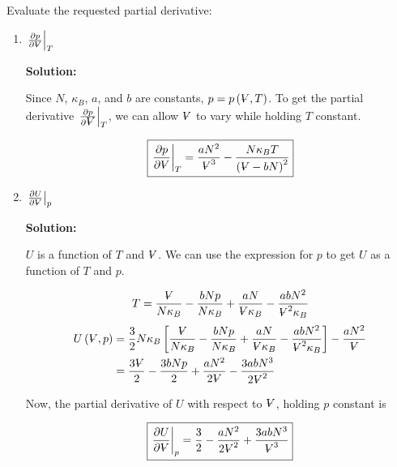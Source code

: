 \documentclass[10pt]{article}
\newenvironment{Solution}
    {\textbf{Solution:}
    
    \vspace{5mm}
    \begin{tcolorbox}
    }
    {
    \end{tcolorbox}
    \vspace{5mm}
    }
\newcommand{\vol}{{\ooalign{\hfil$V$\hfil\cr\kern0.08em--\hfil\cr}}}
\begin{document}
\begin{enumerate}
Evaluate the requested partial derivative: 

\begin{enumerate}
    \item $\left.\frac{\partial p}{\partial \scriptsize{\vol}}\right|_T$
    
    
    \begin{Solution}
    Since $N$, $\kappa_B$, $a$, and $b$ are constants, $p = p\left(\vol, T\right)$. To get the partial derivative $\left.\frac{\partial p}{\partial \vol}\right|_T$, we can allow $\vol$ to vary while holding $T$ constant.
    
    \begin{equation}
    \boxed{
        \left.\frac{\partial p}{\partial \vol}\right|_T =  \frac{a N^2}{\vol^3} - \frac{N\kappa_B T}{\left(\vol -b N\right)^2}
    }
    \end{equation}
    
    \end{Solution}

    \item $\left.\frac{\partial U}{\partial \scriptsize{\vol}}\right|_p$
    

    \begin{Solution}
    $U$ is a function of $T$ and $\vol$. We can use the expression for $p$ to get $U$ as a function of $T$ and $p$. 
    
    \begin{equation}
        T = \frac{\vol}{N\kappa_B} -\frac{b N p}{N\kappa_B} +  \frac{a N}{\vol\kappa_B} - \frac{a b N^2}{\vol^2\kappa_B}
    \end{equation}
    \begin{align}
        U\left(\vol, p\right) &= \frac{3}{2} N \kappa_B \left[\frac{\vol}{N\kappa_B} -\frac{b N p}{N\kappa_B} + \frac{a N}{\vol\kappa_B} - \frac{a b N^2}{\vol^2\kappa_B}\right] - \frac{a N^2}{\vol}
        \\
        &= \frac{3\vol}{2} - \frac{3 b N p}{2} + \frac{ a N^2}{2 \vol} - \frac{3 a b N^3}{2 \vol^2} 
    \end{align}

    Now, the partial derivative of $U$ with respect to $\vol$, holding $p$ constant is 
    
    \begin{equation}
       \boxed{
       \left.\frac{\partial U}{\partial \vol}\right|_p = \frac{3}{2} - \frac{ a N^2}{2 \vol^2} + \frac{3 a b N^3}{ \vol^3}
       }
    \end{equation}


\end{Solution}
\end{enumerate}
\end{enumerate}
\end{document}
